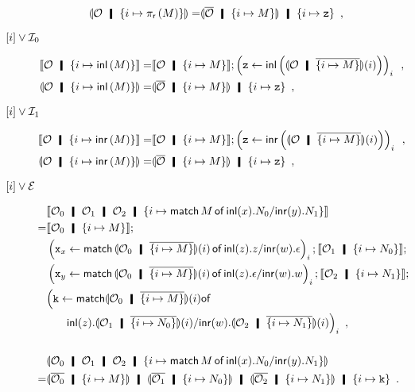 \begin{description}
\begin{align*}
 \semoi{\hypert\hmid \imapsto{\lpir{M}}}=& \semoi{\overline \hypert\hmid
 \imapsto{M}}\hmid
 \{{i\mapsto \p z}\}\enspace,
\end{align*}
 \item[$\lbrack {i}\rbrack\vee\mathcal I_0$]
\begin{align*}
 \semo{\hypert\hmid \imapsto{\linl{M}}} =
 & \semo{\hypert\hmid \imapsto{M}}; \left(\p z \leftarrow
 \linl{ \semoi{\hypert\hmid\overline{\imapsto{M}}}(i)}\right)_i\enspace, \\
 \semoi{\hypert\hmid \imapsto{\linl M}}=& \semoi{\overline \hypert\hmid
 \imapsto{M}}
 \hmid
 \{{i\mapsto \p z}\}\enspace,
\end{align*}
 \item[$\lbrack {i}\rbrack\vee\mathcal I_1$]
\begin{align*}
 \semo{\hypert\hmid \imapsto{\linr M}} =& \semo{\hypert\hmid \imapsto{M}};
 \left(\p z \leftarrow
 \linr{\semoi{\hypert\hmid\overline{\imapsto{M}}}(i)}\right)_i\enspace, \\
 \semoi{\hypert\hmid \imapsto{\linr{M}}}=& \semoi{\overline \hypert\hmid
 \imapsto{M}}\hmid
 \{{i\mapsto \p z}\}\enspace,
\end{align*}
 \item[$\lbrack {i}\rbrack\vee\mathcal E$]
\begin{align*}
 &\semo{\hypert_0\hmid \hypert_1\hmid \hypert_2\hmid \{i\mapsto
 \mat M x{N_0}y{N_1}\}}
 \\
 =&\semo{\hypert_0\hmid\imapsto{M}};\\&
 \left(\p x_x\leftarrow
 \mat{\semoi{\hypert_0\hmid\overline{\imapsto{M}}}(i)}{z}{z}{w}{\epsilon}\right)_i;
 \semo{\hypert_1\hmid\imapsto{N_0}};\\&
 \left(\p x_y\leftarrow
 \mat{\semoi{\hypert_0\hmid\overline{\imapsto{M}}}(i)}{z}{\epsilon}{w}{w}\right)_i;
 \semo{\hypert_2\hmid\imapsto{N_1}};\\&
 \Big(\p k \leftarrow
 \mathsf{match}
 {\semoi{\hypert_0\hmid\overline{\imapsto{M}}}(i)}
 \mathsf{of} \\
 &\phantom{k\leftarrow}\inl{z}. {\semoi{\hypert_1\hmid\overline{\imapsto{N_0}}}(i)}/\inr{w}. {\semoi{\hypert_2\hmid\overline{\imapsto{N_1}}}(i)}\Big)_i\enspace,
 \\
 \\
 &\semoi{\hypert_0\hmid \hypert_1\hmid \hypert_2\hmid \{i\mapsto
 \mat M x{N_0}y{N_1}\}}\\
 =&
 \semoi{\overline{\hypert_0}\hmid \imapsto{M}}\hmid
 \semoi{\overline{\hypert_1}\hmid \imapsto{N_0}}\hmid
 \semoi{\overline{\hypert_2}\hmid \imapsto{N_1}}\hmid \imapsto{\p k}\enspace.
\end{align*}
\end{description}
